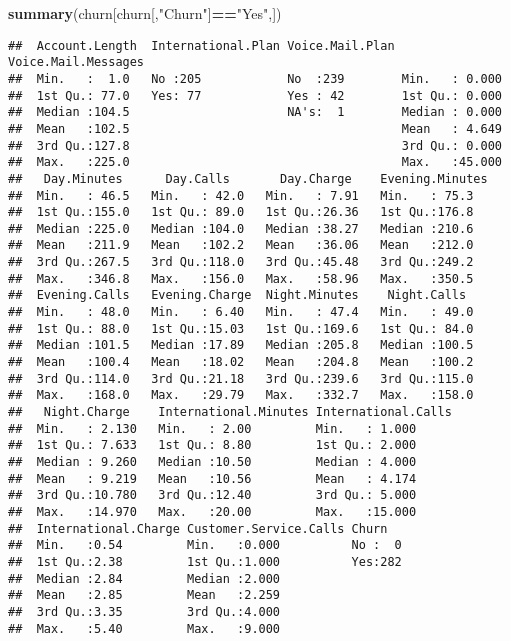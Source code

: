 \documentclass[]{article}
\newenvironment{Shaded}{\begin{snugshade}}{\end{snugshade}}
\newcommand{\KeywordTok}[1]{\textcolor[rgb]{0.13,0.29,0.53}{\textbf{#1}}}
\newcommand{\NormalTok}[1]{#1}
\newcommand{\OperatorTok}[1]{\textcolor[rgb]{0.81,0.36,0.00}{\textbf{#1}}}
\newcommand{\StringTok}[1]{\textcolor[rgb]{0.31,0.60,0.02}{#1}}
\begin{document}
\begin{Shaded}
\begin{Highlighting}[]
\KeywordTok{summary}\NormalTok{(churn[churn[,}\StringTok{"Churn"}\NormalTok{]}\OperatorTok{==}\StringTok{"Yes"}\NormalTok{,])}
\end{Highlighting}
\end{Shaded}

\begin{verbatim}
##  Account.Length  International.Plan Voice.Mail.Plan Voice.Mail.Messages
##  Min.   :  1.0   No :205            No  :239        Min.   : 0.000     
##  1st Qu.: 77.0   Yes: 77            Yes : 42        1st Qu.: 0.000     
##  Median :104.5                      NA's:  1        Median : 0.000     
##  Mean   :102.5                                      Mean   : 4.649     
##  3rd Qu.:127.8                                      3rd Qu.: 0.000     
##  Max.   :225.0                                      Max.   :45.000     
##   Day.Minutes      Day.Calls       Day.Charge    Evening.Minutes
##  Min.   : 46.5   Min.   : 42.0   Min.   : 7.91   Min.   : 75.3  
##  1st Qu.:155.0   1st Qu.: 89.0   1st Qu.:26.36   1st Qu.:176.8  
##  Median :225.0   Median :104.0   Median :38.27   Median :210.6  
##  Mean   :211.9   Mean   :102.2   Mean   :36.06   Mean   :212.0  
##  3rd Qu.:267.5   3rd Qu.:118.0   3rd Qu.:45.48   3rd Qu.:249.2  
##  Max.   :346.8   Max.   :156.0   Max.   :58.96   Max.   :350.5  
##  Evening.Calls   Evening.Charge  Night.Minutes    Night.Calls   
##  Min.   : 48.0   Min.   : 6.40   Min.   : 47.4   Min.   : 49.0  
##  1st Qu.: 88.0   1st Qu.:15.03   1st Qu.:169.6   1st Qu.: 84.0  
##  Median :101.5   Median :17.89   Median :205.8   Median :100.5  
##  Mean   :100.4   Mean   :18.02   Mean   :204.8   Mean   :100.2  
##  3rd Qu.:114.0   3rd Qu.:21.18   3rd Qu.:239.6   3rd Qu.:115.0  
##  Max.   :168.0   Max.   :29.79   Max.   :332.7   Max.   :158.0  
##   Night.Charge    International.Minutes International.Calls
##  Min.   : 2.130   Min.   : 2.00         Min.   : 1.000     
##  1st Qu.: 7.633   1st Qu.: 8.80         1st Qu.: 2.000     
##  Median : 9.260   Median :10.50         Median : 4.000     
##  Mean   : 9.219   Mean   :10.56         Mean   : 4.174     
##  3rd Qu.:10.780   3rd Qu.:12.40         3rd Qu.: 5.000     
##  Max.   :14.970   Max.   :20.00         Max.   :15.000     
##  International.Charge Customer.Service.Calls Churn    
##  Min.   :0.54         Min.   :0.000          No :  0  
##  1st Qu.:2.38         1st Qu.:1.000          Yes:282  
##  Median :2.84         Median :2.000                   
##  Mean   :2.85         Mean   :2.259                   
##  3rd Qu.:3.35         3rd Qu.:4.000                   
##  Max.   :5.40         Max.   :9.000
\end{verbatim}
\end{document}
